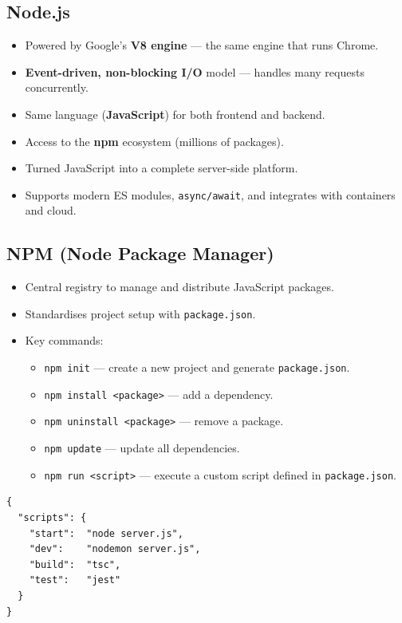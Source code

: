 \documentclass[hidelinks]{article}
\begin{document}
\subsection{Node.js}
\begin{itemize}
  \item Powered by Google's \textbf{V8 engine} --- the same engine that runs Chrome.
  \item \textbf{Event-driven, non-blocking I/O} model --- handles many requests concurrently.
  \item Same language (\textbf{JavaScript}) for both frontend and backend.
  \item Access to the \textbf{npm} ecosystem (millions of packages).
  \item Turned JavaScript into a complete server-side platform.
  \item Supports modern ES modules, \texttt{async/await}, and integrates with containers and cloud.
\end{itemize}

\subsection{NPM (Node Package Manager)}
\begin{itemize}
  \item Central registry to manage and distribute JavaScript packages.
  \item Standardises project setup with \texttt{package.json}.
  \item Key commands:
    \begin{itemize}
      \item \texttt{npm init} --- create a new project and generate \texttt{package.json}.
      \item \texttt{npm install <package>} --- add a dependency.
      \item \texttt{npm uninstall <package>} --- remove a package.
      \item \texttt{npm update} --- update all dependencies.
      \item \texttt{npm run <script>} --- execute a custom script defined in \texttt{package.json}.
    \end{itemize}
\end{itemize}

\begin{lstlisting}[language={}, caption={package.json scripts section}]
{
  "scripts": {
    "start":  "node server.js",
    "dev":    "nodemon server.js",
    "build":  "tsc",
    "test":   "jest"
  }
}
\end{lstlisting}
\end{document}

